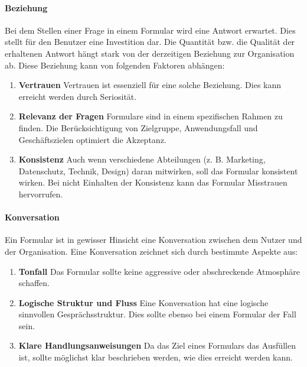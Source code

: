 \paragraph{Beziehung}
Bei dem Stellen einer Frage in einem Formular wird eine Antwort erwartet. Dies stellt für den Benutzer eine Investition dar. Die Quantität bzw. die Qualität der erhaltenen Antwort hängt stark von der derzeitigen Beziehung zur Organisation ab. Diese Beziehung kann von folgenden Faktoren abhängen:
\begin{enumerate}
    \item \textbf{Vertrauen} Vertrauen ist essenziell für eine solche Beziehung. Dies kann erreicht werden durch Seriosität. 
    
    \item \textbf{Relevanz der Fragen} Formulare sind in einem spezifischen Rahmen zu finden. Die Berücksichtigung von Zielgruppe, Anwendungsfall und Geschäftszielen optimiert die Akzeptanz. 
     
    \item \textbf{Konsistenz} Auch wenn verschiedene Abteilungen (z. B. Marketing, Datenschutz, Technik, Design) daran mitwirken, soll das Formular konsistent wirken. Bei nicht Einhalten der Konsistenz kann das Formular Misstrauen hervorrufen.
\end{enumerate} 

\paragraph{Konversation}
Ein Formular ist in gewisser Hinsicht eine Konversation zwischen dem Nutzer und der Organisation. Eine Konversation zeichnet sich durch bestimmte Aspekte aus:
\begin{enumerate}

    \item \textbf{Tonfall} Das Formular sollte keine aggressive oder abschreckende Atmosphäre schaffen. 
    
    \item \textbf{Logische Struktur und Fluss} Eine Konversation hat eine logische sinnvollen Gesprächsstruktur. Dies sollte ebenso bei einem Formular der Fall sein.
    
    \item \textbf{Klare Handlungsanweisungen} Da das Ziel eines Formulars das Ausfüllen ist, sollte möglichst klar beschrieben werden, wie dies erreicht werden kann.
    
\end{enumerate}

